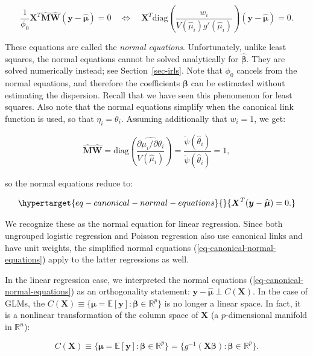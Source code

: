 \documentclass[
  11pt,
  letterpaper,
  oneside]{book}
\theoremstyle{definition}
\theoremstyle{plain}
\theoremstyle{plain}
\theoremstyle{plain}
\theoremstyle{remark}
\begin{document}
\[
\frac{1}{\phi_0}\boldsymbol{X}^T \widehat{\boldsymbol{M}} \widehat{\boldsymbol{W}} (\boldsymbol{y} - \widehat{\boldsymbol{\mu}}) = 0 \quad \Longleftrightarrow \quad \boldsymbol{X}^T \text{diag}\left(\frac{w_i}{V(\widehat \mu_i)g'(\widehat \mu_i)}\right)(\boldsymbol{y} - \widehat{\boldsymbol{\mu}}) = 0.
\]

These equations are called the \emph{normal equations}. Unfortunately,
unlike least squares, the normal equations cannot be solved analytically
for \(\widehat{\boldsymbol{\beta}}\). They are solved numerically
instead; see Section~\ref{sec-irls}. Note that \(\phi_0\) cancels from
the normal equations, and therefore the coefficients
\(\boldsymbol{\beta}\) can be estimated without estimating the
dispersion. Recall that we have seen this phenomenon for least squares.
Also note that the normal equations simplify when the canonical link
function is used, so that \(\eta_i = \theta_i\). Assuming additionally
that \(w_i = 1\), we get:

\[
\boldsymbol{\widehat M} \boldsymbol{\widehat W} = \text{diag}\left(\frac{\widehat{\partial \mu_i/\partial \theta_i}}{V(\widehat \mu_i)}\right) = \frac{\ddot{\psi}(\widehat \theta_i)}{\ddot{\psi}(\widehat \theta_i)} = 1,
\]

so the normal equations reduce to:

\begin{equation}\protect\hypertarget{eq-canonical-normal-equations}{}{
\boldsymbol{X}^T (\boldsymbol{y} - \widehat{\boldsymbol{\mu}}) = 0.
}\label{eq-canonical-normal-equations}\end{equation}

We recognize these as the normal equation for linear regression. Since
both ungrouped logistic regression and Poisson regression also use
canonical links and have unit weights, the simplified normal equations
(\ref{eq-canonical-normal-equations}) apply to the latter regressions as
well.

In the linear regression case, we interpreted the normal equations
(\ref{eq-canonical-normal-equations}) as an orthogonality statement:
\(\boldsymbol{y} - \widehat{\boldsymbol{\mu}} \perp C(\boldsymbol{X})\).
In the case of GLMs, the
\(C(\boldsymbol{X}) \equiv \{\boldsymbol{\mu} = \mathbb{E}[\boldsymbol{y}]: \boldsymbol{\beta} \in \mathbb{R}^p\}\)
is no longer a linear space. In fact, it is a nonlinear transformation
of the column space of \(\boldsymbol{X}\) (a \(p\)-dimensional manifold
in \(\mathbb{R}^n\)):

\[
C(\boldsymbol{X}) \equiv \{\boldsymbol{\mu} = \mathbb{E}[\boldsymbol{y}]: \boldsymbol{\beta} \in \mathbb{R}^p\} = \{g^{-1}(\boldsymbol{X} \boldsymbol{\beta}): \boldsymbol{\beta} \in \mathbb{R}^p\}.
\]
\end{document}
